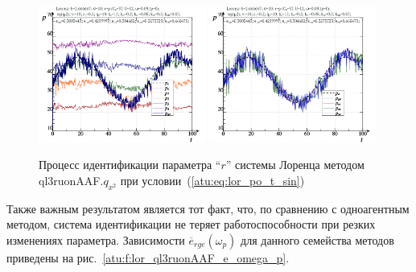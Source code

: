 \begin{figure}[ht!]
  \centerline{
    \includegraphics[width=0.49\textwidth]{p/cha/lor/ql3ruonAAF/lor_ql3ruonAAF_qy2-p_t_pi_sin.png}
    \hfill
    \includegraphics[width=0.49\textwidth]{p/cha/lor/ql3ruonAAF/lor_ql3ruonAAF_qy2-p_t_pz_sin.png}
  }
  \caption{Процесс идентификации параметра ``$r$'' системы Лоренца методом ql3ruonAAF.$q_{x^2}$ при условии~(\ref{atu:eq:lor_po_t_sin})}
  \label{atu:f:lor_id_ql3ruonAAF.q_y2_sin}
\end{figure}

Также важным результатом является тот факт, что, по сравнению с одноагентным методом,
система идентификации не теряет работоспособности
при резких изменениях параметра. Зависимости $\overline{e}_{rge}(\omega_p)$
для данного семейства методов приведены на рис.~\ref{atu:f:lor_ql3ruonAAF_e_omega_p}.


